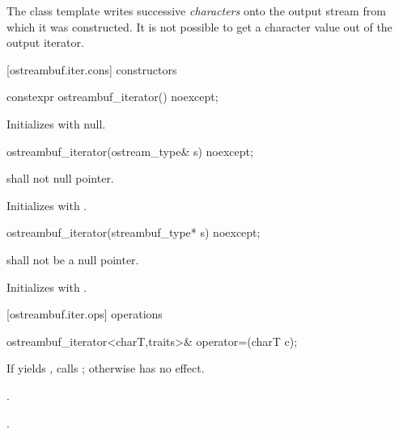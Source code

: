 \pnum
The
class template
writes successive
\textit{characters}
onto the output stream from which it was constructed.
It is not possible to get a character value out of the output iterator.

[ostreambuf.iter.cons]{ constructors}

\begin{addedblock}
%
\begin{itemdecl}
constexpr ostreambuf_iterator() noexcept;
\end{itemdecl}

\begin{itemdescr}
\pnum
\effects
Initializes  with null.
\end{itemdescr}
\end{addedblock}

%
\begin{itemdecl}
ostreambuf_iterator(ostream_type& s) noexcept;
\end{itemdecl}

\begin{itemdescr}
\pnum
\requires
{}
shall not null pointer.
\end{itemdescr}

\begin{itemdescr}
\pnum
\effects
Initializes  with .
\end{itemdescr}


%
\begin{itemdecl}
ostreambuf_iterator(streambuf_type* s) noexcept;
\end{itemdecl}

\begin{itemdescr}
\pnum
\requires
{}
shall not be a null pointer.

\pnum
\effects
Initializes  with .
\end{itemdescr}

[ostreambuf.iter.ops]{ operations}

%
\begin{itemdecl}
ostreambuf_iterator<charT,traits>&
  operator=(charT c);
\end{itemdecl}

\begin{itemdescr}
\pnum
\effects
If
yields
,
calls
;
otherwise has no effect.

\begin{addedblock}
\pnum
\requires {}.
\end{addedblock}

\pnum
\returns
{}.
\end{itemdescr}

